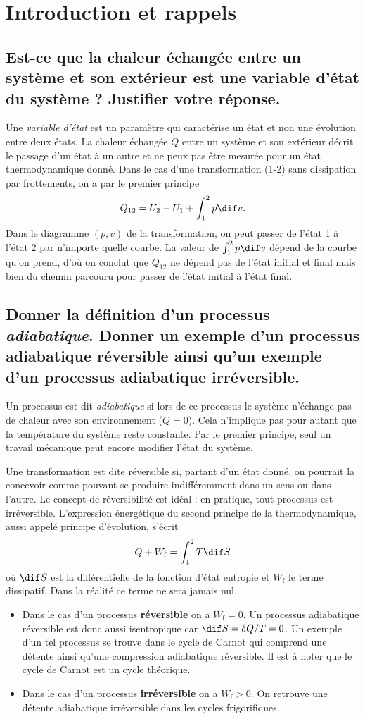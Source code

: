 \section{Introduction et rappels}
\subsection{Est-ce que la chaleur échangée entre un système et son extérieur est une variable d'état du système ? Justifier votre réponse.}
Une \emph{variable d'état} est un paramètre qui caractérise un état et non une évolution entre deux états.
La chaleur échangée $Q$ entre un système et son extérieur décrit le passage d'un état à un autre et ne peux pas être mesurée pour un état thermodynamique donné.
Dans le cas d'une transformation (1-2) sans dissipation par frottements, on a par le premier principe
\[ Q_{12} = U_2 - U_1 + \int_1^2 p \dif v. \]
Dans le diagramme $(p,v)$ de la transformation, on peut passer de l'état 1 à l'état 2 par n'importe quelle courbe.
La valeur de $\int_1^2 p \dif v$ dépend de la courbe qu'on prend, d'où on conclut que $Q_{12}$ ne dépend pas de l'état initial et final mais bien du chemin parcouru pour passer de l'état initial à l'état final.

\subsection{Donner la définition d'un processus \textit{adiabatique}. 
Donner un exemple d'un processus adiabatique réversible ainsi qu'un exemple d'un processus adiabatique irréversible.}
Un processus est dit \emph{adiabatique} si lors de ce processus le système n'échange pas de chaleur avec son environnement ($Q = 0$). 
Cela n'implique pas pour autant que la température du système reste constante. 
Par le premier principe, seul un travail mécanique peut encore modifier l'état du système.

Une transformation est dite réversible si, partant d'un état donné, on pourrait la concevoir comme pouvant se produire indifféremment dans un sens ou dans l'autre.
Le concept de réversibilité est idéal : en pratique, tout processus est irréversible.
L'expression énergétique du second principe de la thermodynamique, aussi appelé principe d'évolution, s'écrit 
\[ Q + W_\mathrm{f} = \int_1^2T \dif S \]
où $\dif S$ est la différentielle de la fonction d'état entropie et $W_\mathrm{f}$ le terme dissipatif. 
Dans la réalité ce terme ne sera jamais nul. 
\begin{itemize}
	\item Dans le cas d'un processus \textbf{réversible} on a $W_\mathrm{f} = 0$. 
		Un processus adiabatique réversible est donc aussi isentropique car $\dif S = \delta Q/T = 0$. 
		Un exemple d'un tel processus se trouve dans le cycle de Carnot qui comprend une détente ainsi qu'une compression adiabatique réversible. 
		Il est à noter que le cycle de Carnot est un cycle théorique.
	\item Dans le cas d'un processus \textbf{irréversible} on a $W_\mathrm{f} > 0$.
		On retrouve une détente adiabatique irréversible dans les cycles frigorifiques. 
\end{itemize}

